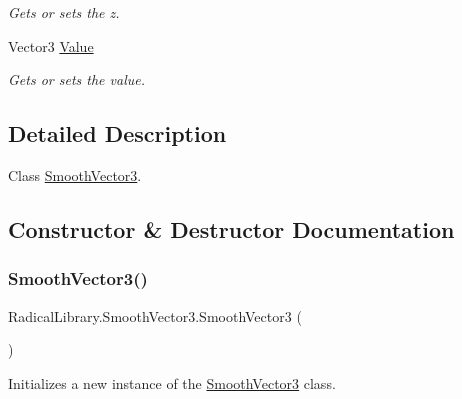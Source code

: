 \begin{DoxyCompactItemize}
\begin{DoxyCompactList}\small\item\em Gets or sets the z. \end{DoxyCompactList}\item 
Vector3 \hyperlink{class_radical_library_1_1_smooth_vector3_a6ef6199f8868c5a4a04e3186dc8f6ca7}{Value}
\begin{DoxyCompactList}\small\item\em Gets or sets the value. \end{DoxyCompactList}\end{DoxyCompactItemize}


\subsection{Detailed Description}
Class \hyperlink{class_radical_library_1_1_smooth_vector3}{Smooth\+Vector3}. 



\subsection{Constructor \& Destructor Documentation}
\mbox{\label{class_radical_library_1_1_smooth_vector3_aad45af5d380eab1fc102d5f77e2776d8}} 
\subsubsection{\texorpdfstring{Smooth\+Vector3()}{SmoothVector3()}\hspace{0.1cm}{\footnotesize\ttfamily [1/3]}}
{\footnotesize\ttfamily Radical\+Library.\+Smooth\+Vector3.\+Smooth\+Vector3 (\begin{DoxyParamCaption}{ }\end{DoxyParamCaption})\hspace{0.3cm}{\ttfamily [inline]}}



Initializes a new instance of the \hyperlink{class_radical_library_1_1_smooth_vector3}{Smooth\+Vector3} class. 

\mbox{\label{class_radical_library_1_1_smooth_vector3_a3873c455a7e39149ad1b54b1ca6b94f3}} 
